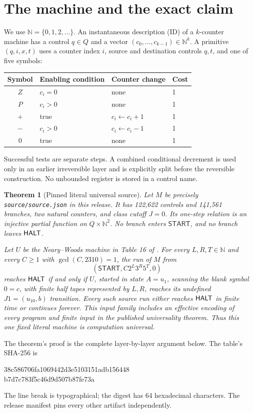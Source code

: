 \documentclass[11pt,a4paper]{article}
\numberwithin{equation}{section}
\newtheorem{theorem}{Theorem}[section]
\newcommand{\N}{\mathbb N}\newcommand{\Z}{\mathbb Z}\newcommand{\R}{\mathbb R}
\newcommand{\START}{\mathsf{START}}
\newcommand{\code}[1]{\texttt{\small #1}}
\begin{document}
\section{The machine and the exact claim}\label{fpa:rep:16:first}\label{fpa:ls:sec:source}
We use $\N=\{0,1,2,\ldots\}$. An instantaneous description (ID) of a
$k$-counter machine has a control $q\in Q$ and a vector $(c_0,\ldots,c_{k-1})\in\N^k$.
A primitive $(q,i,x,t)$ uses a counter index $i$, source and destination
controls $q,t$, and one of five symbols:
\begin{center}
\begin{tabular}{clll}\toprule
Symbol & Enabling condition & Counter change & Cost\\\midrule
$Z$ & $c_i=0$ & none & 1\\
$P$ & $c_i>0$ & none & 1\\
$+$ & true & $c_i\gets c_i+1$ & 1\\
$-$ & $c_i>0$ & $c_i\gets c_i-1$ & 1\\
$0$ & true & none & 1\\\bottomrule
\end{tabular}
\end{center}
Successful tests are separate steps. A combined conditional decrement is used
only in an earlier irreversible layer and is explicitly split before the
reversible construction. No unbounded register is stored in a control name.

\begin{theorem}[Pinned literal universal source]\label{fpa:ls:thm:literal}
Let $M$ be precisely \code{source/source.json} in this release. It has
122,622 controls and 141,561 branches, two natural counters, and class cutoff
$J=0$. Its one-step relation is an injective partial function on
$Q\times\N^2$. No branch enters $\START$, and no branch leaves $\mathsf{HALT}$.

Let $U$ be the Neary--Woods machine in Table 16 of \cite{fpa:nw}.
For every $L,R,T\in\N$ and every $C\ge1$ with $\gcd(C,2310)=1$, the run of
$M$ from
\[
             (\START,C2^L3^R5^T,0)                         \tag{1}\label{fpa:ls:eq:input}
\]
reaches $\mathsf{HALT}$ if and only if $U$, started in state $A=u_1$, scanning the
blank symbol $0=c$, with finite half tapes represented by $L,R$, reaches its
undefined $J1=(u_{10},b)$ transition. Every such source run either reaches
$\mathsf{HALT}$ in finite time or continues forever. This input family includes an
effective encoding of every program and finite input in the published
universality theorem. Thus this one fixed literal machine is computation
universal.
\end{theorem}
The theorem's proof is the complete layer-by-layer argument below. The table's
SHA-256 is
\begin{center}\small\ttfamily
38c586706fa1069442d3e5103151adb156448\\
b7d7c783f5c46d9d507b87fe73a
\end{center}
The line break is typographical; the digest has 64 hexadecimal characters.
The release manifest pins every other artifact independently.
\end{document}
